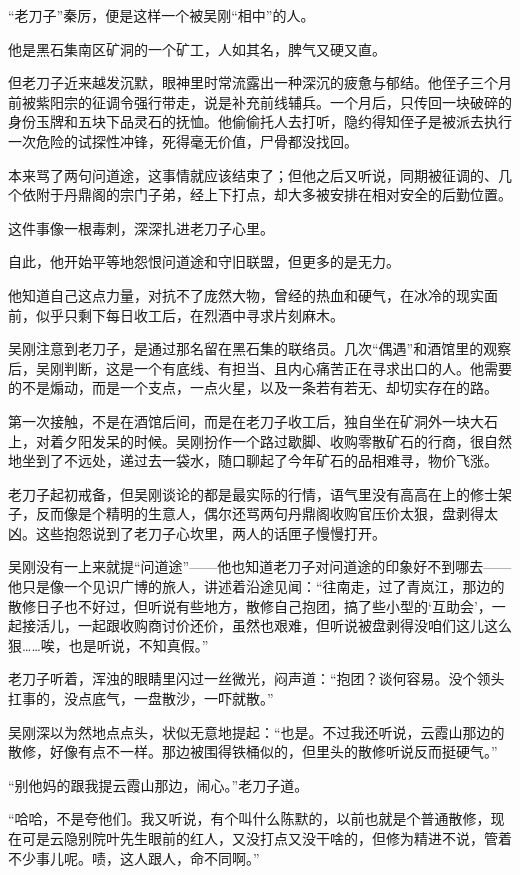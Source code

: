 “老刀子”秦厉，便是这样一个被吴刚“相中”的人。

他是黑石集南区矿洞的一个矿工，人如其名，脾气又硬又直。

但老刀子近来越发沉默，眼神里时常流露出一种深沉的疲惫与郁结。他侄子三个月前被紫阳宗的征调令强行带走，说是补充前线辅兵。一个月后，只传回一块破碎的身份玉牌和五块下品灵石的抚恤。他偷偷托人去打听，隐约得知侄子是被派去执行一次危险的试探性冲锋，死得毫无价值，尸骨都没找回。

本来骂了两句问道途，这事情就应该结束了；但他之后又听说，同期被征调的、几个依附于丹鼎阁的宗门子弟，经上下打点，却大多被安排在相对安全的后勤位置。

这件事像一根毒刺，深深扎进老刀子心里。

自此，他开始平等地怨恨问道途和守旧联盟，但更多的是无力。

他知道自己这点力量，对抗不了庞然大物，曾经的热血和硬气，在冰冷的现实面前，似乎只剩下每日收工后，在烈酒中寻求片刻麻木。

吴刚注意到老刀子，是通过那名留在黑石集的联络员。几次“偶遇”和酒馆里的观察后，吴刚判断，这是一个有底线、有担当、且内心痛苦正在寻求出口的人。他需要的不是煽动，而是一个支点，一点火星，以及一条若有若无、却切实存在的路。

第一次接触，不是在酒馆后间，而是在老刀子收工后，独自坐在矿洞外一块大石上，对着夕阳发呆的时候。吴刚扮作一个路过歇脚、收购零散矿石的行商，很自然地坐到了不远处，递过去一袋水，随口聊起了今年矿石的品相难寻，物价飞涨。

老刀子起初戒备，但吴刚谈论的都是最实际的行情，语气里没有高高在上的修士架子，反而像是个精明的生意人，偶尔还骂两句丹鼎阁收购官压价太狠，盘剥得太凶。这些抱怨说到了老刀子心坎里，两人的话匣子慢慢打开。

吴刚没有一上来就提“问道途”——他也知道老刀子对问道途的印象好不到哪去——他只是像一个见识广博的旅人，讲述着沿途见闻：“往南走，过了青岚江，那边的散修日子也不好过，但听说有些地方，散修自己抱团，搞了些小型的‘互助会’，一起接活儿，一起跟收购商讨价还价，虽然也艰难，但听说被盘剥得没咱们这儿这么狠……唉，也是听说，不知真假。”

老刀子听着，浑浊的眼睛里闪过一丝微光，闷声道：“抱团？谈何容易。没个领头扛事的，没点底气，一盘散沙，一吓就散。”

吴刚深以为然地点点头，状似无意地提起：“也是。不过我还听说，云霞山那边的散修，好像有点不一样。那边被围得铁桶似的，但里头的散修听说反而挺硬气。”

“别他妈的跟我提云霞山那边，闹心。”老刀子道。

“哈哈，不是夸他们。我又听说，有个叫什么陈默的，以前也就是个普通散修，现在可是云隐别院叶先生眼前的红人，又没打点又没干啥的，但修为精进不说，管着不少事儿呢。啧，这人跟人，命不同啊。”

